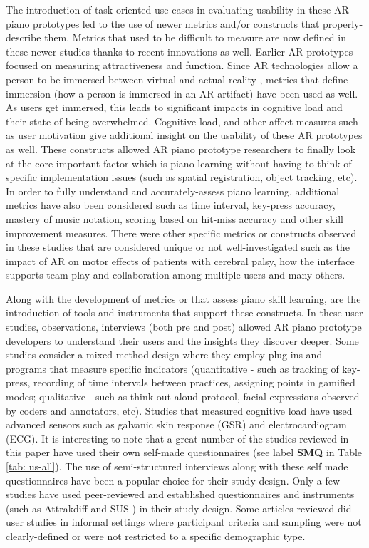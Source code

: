 \documentclass[sigchi, review]{acmart}
\begin{document}
The introduction of task-oriented use-cases in evaluating usability in these AR piano prototypes led to the use of newer metrics and/or constructs that properly-describe them. Metrics that used to be difficult to measure are now defined in these newer studies thanks to recent innovations as well. Earlier AR prototypes focused on measuring attractiveness and function. Since AR technologies allow a person to be immersed between virtual and actual reality \cite{milgram1995augmented}, metrics that define immersion (how a person is immersed in an AR artifact) have been used as well. As users get immersed, this leads to significant impacts in cognitive load and their state of being overwhelmed. Cognitive load, and other affect measures such as user motivation give additional insight on the usability of these AR prototypes as well. These constructs allowed AR piano prototype researchers to finally look at the core important factor which is piano learning without having to think of specific implementation issues (such as spatial registration, object tracking, etc). In order to fully understand and accurately-assess piano learning, additional metrics have also been considered such as time interval, key-press accuracy, mastery of music notation, scoring based on hit-miss accuracy and other skill improvement measures. There were other specific metrics or constructs observed in these studies that are considered unique or not well-investigated such as the impact of AR on motor effects of patients with cerebral palsy, how the interface supports team-play and collaboration among multiple users and many others. 

Along with the development of metrics or that assess piano skill learning, are the introduction of tools and instruments that support these constructs. In these user studies, observations, interviews (both pre and post) allowed AR piano prototype developers to understand their users and the insights they discover deeper. Some studies consider a mixed-method design where they employ plug-ins and programs that measure specific indicators (quantitative - such as tracking of key-press, recording of time intervals between practices, assigning points in gamified modes; qualitative - such as think out aloud protocol, facial expressions observed by coders and annotators, etc). Studies that measured cognitive load have used advanced sensors such as galvanic skin response (GSR) and electrocardiogram (ECG). It is interesting to note that a great number of the studies reviewed in this paper have used their own self-made questionnaires (see label \textbf{SMQ} in Table \ref{tab: us-all}). The use of semi-structured interviews along with these self made questionnaires have been a popular choice for their study design. Only a few studies have used peer-reviewed and established questionnaires and instruments (such as Attrakdiff \cite{hassenzahl2003attrakdiff} and SUS \cite{lewis2009factor})  in their study design. Some articles reviewed did user studies in informal settings where participant criteria and sampling were not clearly-defined or were not restricted to a specific demographic type. 
\end{document}
